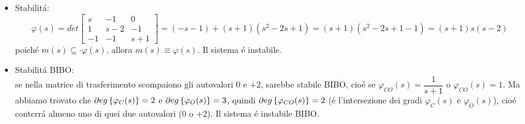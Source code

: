 \documentclass[../main.tex]{subfiles}
\begin{document}
\begin{Exercise}[title={Studiare propriet\'a di sistemi interconnessi}, difficulty=3]
\begin{enumerate}
\begin{itemize}
								Calcoliamo completamente $ Q $ per studiare l'osservabilit\'a da ogni singola uscita:
								\[
									Q=
									\begin{bmatrix}
										1 & 1 & 0\\
										0 & 1 & 0\\
										0 & 0 & 1\\
										\cline{1-3}\\
										-1 & 3 & 1\\
										-1 & 2 & 1\\
										1 & 1 & -1\\
										\cline{1-3}\\
										-2 & 6 & 2\\
										-1 & 4 & 1\\
										-2 & 2 & 2
									\end{bmatrix}
								\]
								Le prime righe di ogni sottomatrice non sono linearmente indipendenti, quindi il sistema non \'e completamente osservabile da $ y_1 $.\\
								Le seconde righe di ogni sottomatrice non sono linearmente indipendenti, quindi il sistema non \'e completamente osservabile da $ y_2 $.\\
								Le terze righe di ogni sottomatrice sono linearmente indipendenti(bisogna calcolare tutti i minori), quindi il sistema non \'e completamente osservabile da $ y_3 $.\\
							\item Stabilit\'a:
								\[
									\varphi(s) = det
									\begin{bmatrix}
										s & -1 & 0\\
										1 & s-2 & -1\\
										-1 & -1 & s+1
									\end{bmatrix} =
									(-s-1)+(s+1)(s^2-2s+1) = (s+1)(s^2-2s+1-1) =(s+1)s(s-2)
								\]
								poich\'e $ m(s) \subseteq\cdot \varphi(s) $, allora $ m(s) \equiv \varphi(s) $. Il sistema \'e instabile.
							\item Stabilit\'a BIBO:\\
								se nella matrice di trasferimento scompaiono gli autovalori $ 0 $ e $ +2 $, sarebbe stabile BIBO, cio\'e se $ \varphi_{CO}(s) = \dfrac{1}{s+1} $ o $ \varphi_{CO}(s) = 1 $. Ma abbiamo trovato che $ \partial eg \left\lbrace \varphi_C(s) \right\rbrace = 2 $ e $ \partial eg \left\lbrace \varphi_{O}(s) \right\rbrace = 3 $, quindi $ \partial eg \left\lbrace \varphi_{CO}(s) \right\rbrace = 2 $ (\'e l'intersezione dei gradi $ \varphi_C(s) $ e $ \varphi_O(s) $), cio\'e conterr\'a almeno uno di quei due autovalori ($ 0 $ o $ +2 $). Il sistema \'e instabile BIBO.
						\end{itemize}
				\end{enumerate}
			\end{Exercise}
	
\end{document}
